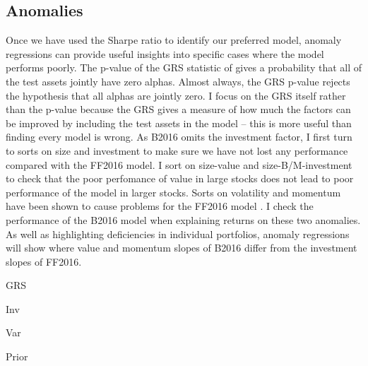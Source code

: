 
\subsection{Anomalies}

Once we have used the Sharpe ratio to identify our preferred model, anomaly regressions
can provide useful insights into specific cases where the model performs poorly. The
p-value of the GRS statistic of \textcite{gibbons1989test} gives a probability that all of
the test assets jointly have zero alphas. Almost always, the GRS p-value rejects the
hypothesis that all alphas are jointly zero. I focus on the GRS itself rather than the
p-value because the GRS gives a measure of how much the factors can be improved by
including the test assets in the model -- this is more useful than finding every model is
wrong. As B2016 omits the investment factor, I first turn to sorts on size and investment
to make sure we have not lost any performance compared with the FF2016 model. I sort on
size-value and size-B/M-investment to check that the poor perfomance of value in large
stocks \parencite{asness2015fact} does not lead to poor performance of the model in larger
stocks. Sorts on volatility \parencite{ang2006cross} and momentum
\parencite{jegadeesh1993returns} have been shown to cause problems for the FF2016 model
\parencite{fama2016dissecting}. I check the performance of the B2016 model when explaining
returns on these two anomalies. As well as highlighting deficiencies in individual
portfolios, anomaly regressions will show where value and momentum slopes of B2016 differ
from the investment slopes of FF2016.

{GRS}

{Inv}


{Var}

{Prior}
